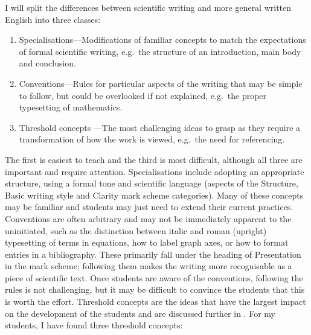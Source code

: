 I will split the differences between scientific writing and more general written English into three classes:
\begin{enumerate}
\item Specialisations---Modifications of familiar concepts to match the expectations of formal scientific writing, e.g.\ the structure of an introduction, main body and conclusion.
\item Conventions---Rules for particular aspects of the writing that may be simple to follow, but could be overlooked if not explained, e.g.\ the proper typesetting of mathematics.
\item Threshold concepts \citep{Meyer2003}---The most challenging ideas to grasp as they require a transformation of how the work is viewed, e.g.\ the need for referencing.
\end{enumerate}
The first is easiest to teach and the third is most difficult, although all three are important and require attention. Specialisations include adopting an appropriate structure, using a formal tone and scientific language (aspects of the Structure, Basic writing style and Clarity mark scheme categories). Many of these concepts may be familiar and students may just need to extend their current practices. Conventions are often arbitrary and may not be immediately apparent to the uninitiated, such as the distinction between italic and roman (upright) typesetting of terms in equations, how to label graph axes, or how to format entries in a bibliography. These primarily fall under the heading of Presentation in the mark scheme; following them makes the writing more recognisable as a piece of scientific text. Once students are aware of the conventions, following the rules is not challenging, but it may be difficult to convince the students that this is worth the effort. Threshold concepts are the ideas that have the largest impact on the development of the students and are discussed further in . For my students, I have found three threshold concepts:
